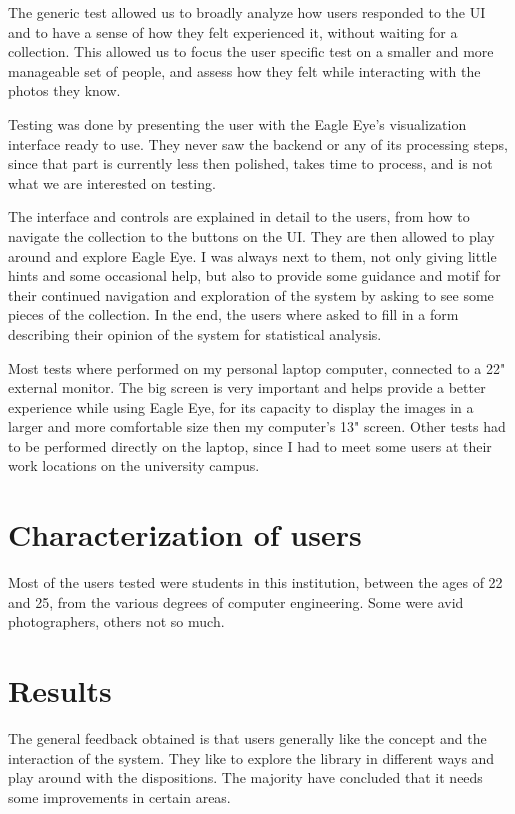 The generic test allowed us to broadly analyze how users responded to the \ac{UI} and to have a sense of how they felt experienced it, without waiting for a collection. This allowed us to focus the user specific test on a smaller and more manageable set of people, and assess how they felt while interacting with the photos they know.

Testing was done by presenting the user with the Eagle Eye's visualization interface ready to use. They never saw the backend or any of its processing steps, since that part is currently less then polished, takes time to process, and is not what we are interested on testing.

The interface and controls are explained in detail to the users, from how to navigate the collection to the buttons on the \ac{UI}. They are then allowed to play around and explore Eagle Eye. I was always next to them, not only giving little hints and some occasional help, but also to provide some guidance and motif for their continued navigation and exploration of the system by asking to see some pieces of the collection. In the end, the users where asked to fill in a form describing their opinion of the system for statistical analysis.

Most tests where performed on my personal laptop computer, connected to a 22" external monitor. The big screen is very important and helps provide a better experience while using Eagle Eye, for its capacity to display the images in a larger and more comfortable size then my computer's 13" screen. Other tests had to be performed directly on the laptop, since I had to meet some users at their work locations on the university campus.

\section{Characterization of users}

Most of the users tested were students in this institution, between the ages of 22 and 25, from the various degrees of computer engineering. Some were avid photographers, others not so much.


\section{Results}

The general feedback obtained is that users generally like the concept and the interaction of the system. They like to explore the library in different ways and play around with the dispositions. The majority have concluded that it needs some improvements in certain areas.

